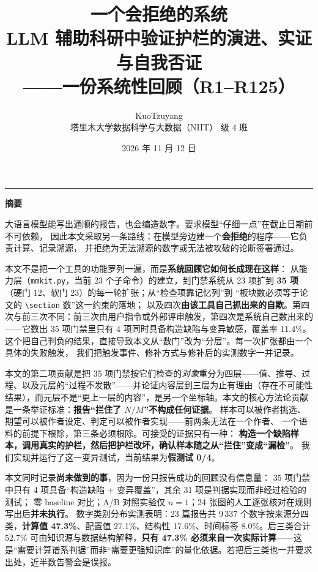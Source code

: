 \documentclass[11pt,a4paper]{article}
\title{\vspace{-1.2cm}\textbf{一个会拒绝的系统}\\[2pt]
\large LLM 辅助科研中验证护栏的演进、实证与自我否证\\[2pt]
\normalsize ——一份系统性回顾（R1--R125）}
\author{KuoTzuyang\\[2pt]
\small 塔里木大学\quad 数据科学与大数据（NIIT）\quad 2026 级 4 班}
\date{2026 年 11 月 12 日}
\newcommand{\code}[1]{\texttt{#1}}
\begin{document}
\maketitle
\vspace{-0.6cm}

\begin{center}\rule{0.95\textwidth}{0.4pt}\end{center}
\begin{center}\textbf{摘\quad 要}\end{center}

大语言模型能写出通顺的报告，也会编造数字。要求模型“仔细一点”在截止日期前不可依赖，
因此本文采取另一条路线：在模型旁边建一个\textbf{会拒绝}的程序——它负责计算、记录溯源，
并拒绝为无法溯源的数字或无法被攻破的论断签署通过。

本文不是把一个工具的功能罗列一遍，而是\textbf{系统回顾它如何长成现在这样}：
从能力层（\code{mmkit.py}，当前 23 个子命令）的建立，到门禁系统从 23 项扩到
\textbf{35 项}（硬门 12、软门 23）的每一轮扩张；从“检查项靠记忆列”到
“板块数必须等于论文的 \code{\textbackslash section} 数”这一约束的落地；
以及四次\textbf{由该工具自己抓出来的自欺}。第四次与前三次不同：前三次由用户指令或外部评审触发，第四次是系统自己数出来的——它数出 35 项门禁里只有 4 项同时具备构造缺陷与变异敏感，覆盖率 11.4\%。这个把自己判负的结果，直接导致本文从“数门”改为“分层”。每一次扩张都由一个具体的失败触发，
我们把触发事件、修补方式与修补后的实测数字一并记录。

本文的第二项贡献是把 35 项门禁按它们检查的\emph{对象}重分为四层——值、推导、过程、以及元层的“过程不发散”——并论证内容层到三层为止有理由（存在不可能性结果），而元层不是“更上一层的内容”，是另一个坐标轴。本文的核心方法论贡献是一条举证标准：\textbf{报告“拦住了 $N/M$”不构成任何证据}。
样本可以被作者挑选、期望可以被作者设定、判定可以被作者实现——前两条无法在一个作者、
一个语料的前提下根除，第三条必须根除。可接受的证据只有一种：
\textbf{构造一个缺陷样本，调用真实的护栏，然后把护栏改坏，确认样本随之从“拦住”变成“漏检”}。
我们实现并运行了这一变异测试，当前结果为\textbf{假测试 0/4}。

本文同时记录\textbf{尚未做到的事}，因为一份只报告成功的回顾没有信息量：
35 项门禁中只有 4 项具备“构造缺陷 + 变异覆盖”，其余 31 项是判据实现而非经过检验的测试；
零 baseline 对比；A/B 对照实验仅 $n=1$；24 张图的人工逐张核对在规则写出后\textbf{并未执行}。
数字类别分布实测表明：23 篇报告共 9\,337 个数字按来源分四类，\textbf{计算值 47.3\%}、配置值 27.1\%、结构性 17.6\%、时间标签 8.0\%。后三类合计 52.7\% 可由知识源与数据结构解释，\textbf{只有 47.3\% 必须来自一次实际计算}——这是“需要计算谱系判据”而非“需要更强知识库”的量化依据。若把后三类也一并要求出处，近半数告警会是误报。
\end{document}
